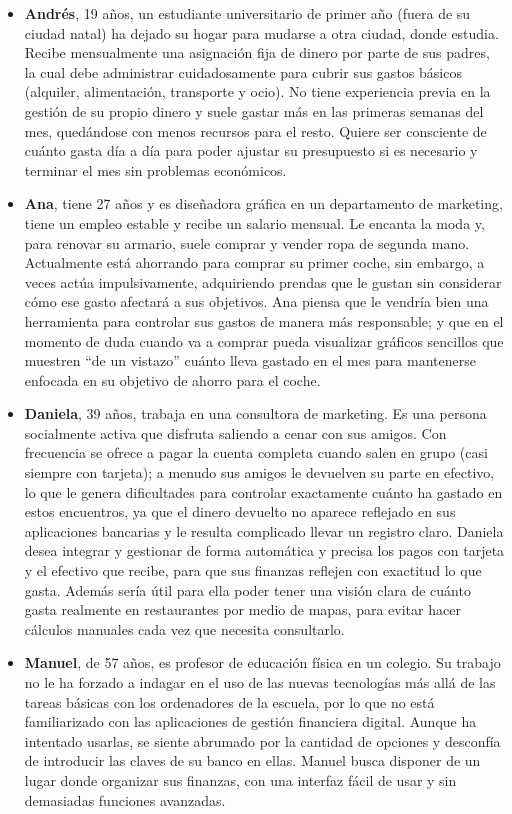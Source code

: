 \begin{itemize}
    \item \textbf{Andrés}, 19 años, un estudiante universitario de primer año (fuera de su ciudad natal) ha dejado su hogar para mudarse a otra ciudad, donde estudia. Recibe mensualmente una asignación fija de dinero por parte de sus padres, la cual debe administrar cuidadosamente para cubrir sus gastos básicos (alquiler, alimentación, transporte y ocio). No tiene experiencia previa en la gestión de su propio dinero y suele gastar más en las primeras semanas del mes, quedándose con menos recursos para el resto. Quiere ser consciente de cuánto gasta día a día para poder ajustar su presupuesto si es necesario y terminar el mes sin problemas económicos.

    \item \textbf{Ana}, tiene 27 años y es diseñadora gráfica en un departamento de marketing, tiene un empleo estable y recibe un salario mensual. Le encanta la moda y, para renovar su armario, suele comprar y vender ropa de segunda mano. Actualmente está ahorrando para comprar su primer coche, sin embargo, a veces actúa impulsivamente, adquiriendo prendas que le gustan sin considerar cómo ese gasto afectará a sus objetivos. Ana piensa que le vendría bien una herramienta para controlar sus gastos de manera más responsable; y que en el momento de duda cuando va a comprar pueda visualizar gráficos sencillos que muestren ``de un vistazo'' cuánto lleva gastado en el mes para mantenerse enfocada en su objetivo de ahorro para el coche.
    
    \item \textbf{Daniela}, 39 años, trabaja en una consultora de marketing. Es una persona socialmente activa que disfruta saliendo a cenar con sus amigos. Con frecuencia se ofrece a pagar la cuenta completa cuando salen en grupo (casi siempre con tarjeta); a menudo sus amigos le devuelven su parte en efectivo, lo que le genera dificultades para controlar exactamente cuánto ha gastado en estos encuentros, ya que el dinero devuelto no aparece reflejado en sus aplicaciones bancarias y le resulta complicado llevar un registro claro. Daniela desea integrar y gestionar de forma automática y precisa los pagos con tarjeta y el efectivo que recibe, para que sus finanzas reflejen con exactitud lo que gasta. Además sería útil para ella poder tener una visión clara de cuánto gasta realmente en restaurantes por medio de mapas, para evitar hacer cálculos manuales cada vez que necesita consultarlo.
    
    \item \textbf{Manuel}, de 57 años, es profesor de educación física en un colegio. Su trabajo no le ha forzado a indagar en el uso de las nuevas tecnologías más allá de las tareas básicas con los ordenadores de la escuela, por lo que no está familiarizado con las aplicaciones de gestión financiera digital. Aunque ha intentado usarlas, se siente abrumado por la cantidad de opciones y desconfía de introducir las claves de su banco en ellas. Manuel busca disponer de un lugar donde organizar sus finanzas, con una interfaz fácil de usar y sin demasiadas funciones avanzadas.
    
\end{itemize}

